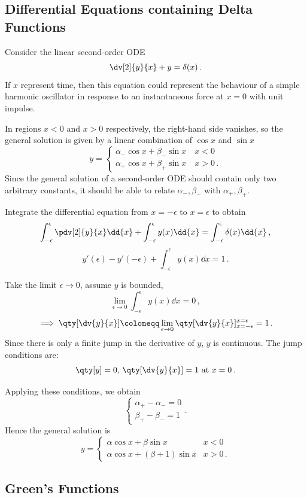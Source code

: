 \documentclass{article}
\theoremstyle{plain}\theoremheaderfont{\normalfont\itshape}\theorembodyfont{\rmfamily}\theoremseparator{.}\newtheorem*{rem}{Remark}\newtheorem*{ex}{Example}\newtheorem*{proof}{Proof}\newtheorem*{altp}{Alternative proof}
\theoremstyle{plain}\theoremheaderfont{\normalfont\bfseries}\theorembodyfont{\rmfamily}\theoremseparator{.}\newtheorem{thm}{Theorem}[section]\newtheorem{lem}[thm]{Lemma}\newtheorem{prop}[thm]{Proposition}\newtheorem*{cor}{Corollary}\newtheorem{defn}[thm]{Definition}\newtheorem{clm}[thm]{Claim}\newtheorem{clminproof}{Claim}
\theoremstyle{break}\theoremheaderfont{\normalfont\itshape}\theorembodyfont{\rmfamily}\theoremseparator{.\medskip}\newtheorem*{proofskip}{Proof}\newtheorem*{exs}{Examples}\newtheorem*{rems}{Remarks}
\theoremstyle{break}\theoremheaderfont{\normalfont\bfseries}\theorembodyfont{\rmfamily}\theoremseparator{.\medskip}\newtheorem{lemskip}[thm]{Lemma}\newtheorem{defnskip}[thm]{Definition}\newtheorem{propskip}[thm]{Proposition}\newtheorem{thmskip}[thm]{Theorem}
\numberwithin{equation}{section}
\begin{document}
	\subsection{Differential Equations containing Delta Functions}
	Consider the linear second-order ODE
	\[\dv[2]{y}{x}+y=\delta(x)\,.\]
	If \(x\) represent time, then this equation could represent the behaviour of a simple harmonic oscillator in response to an instantaneous force at \(x=0\) with unit impulse.
	
	In regions \(x<0\) and \(x>0\) respectively, the right-hand side vanishes, so the general solution is given by a linear combination of \(\cos x\) and \(\sin x\)
	\[y=\begin{cases}
		\alpha_-\cos x+\beta_-\sin x \quad x<0\\
		\alpha_+\cos x+\beta_+\sin x \quad x>0\,.
	\end{cases}\]
	Since the general solution of a second-order ODE should contain only two arbitrary constants, it should be able to relate \(\alpha_-, \beta_-\) with \(\alpha_+,\beta_+\).
	
	Integrate the differential equation from \(x=-\epsilon\) to \(x=\epsilon\) to obtain
	\[\int_{-\epsilon}^{\epsilon}\pdv[2]{y}{x}\dd{x}+\int_{-\epsilon}^{\epsilon}y(x)\dd{x}=\int_{-\epsilon}^{\epsilon}\delta(x)\dd{x}\,,\]
	\[y'(\epsilon)-y'(-\epsilon)+\int_{-\epsilon}^{\epsilon}y(x)\dd{x}=1\,.\]
	
	Take the limit \(\epsilon\to 0\), assume \(y\) is bounded,
	\[\lim_{\epsilon\to 0}\int_{-\epsilon}^{\epsilon}y(x)\dd{x}=0\,,\]
	\[\implies\qty[\dv{y}{x}]\coloneqq\lim_{\epsilon\to 0}\qty[\dv{y}{x}]^{x=\epsilon}_{x=-\epsilon}=1\,.\]
	Since there is only a finite jump in the derivative of \(y\), \(y\) is continuous. The jump conditions are:
	\[\qty[y]=0,\, \qty[\dv{y}{x}]=1 \text{ at } x=0\,.\]
	
	Applying these conditions, we obtain
	\[\begin{cases}
		\alpha_+-\alpha_-=0\\
		\beta_+-\beta_-=1
	\end{cases}.\]
	Hence the general solution is
	\[y=\begin{cases}
		\alpha\cos x+\beta\sin x & x<0\\
		\alpha\cos x+(\beta+1)\sin x& x>0\,.
	\end{cases}\]
	
	\subsection{Green's Functions}
\end{document}

